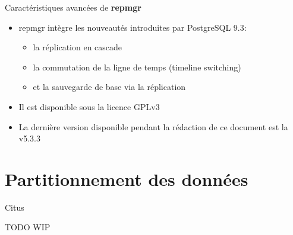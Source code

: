 
\begin{frame}[fragile]{Caractéristiques avancées de \textbf{repmgr}}

   \begin{itemize}
      \item repmgr intègre les nouveautés introduites par PostgreSQL 9.3:
         \begin{itemize}
            \item la réplication en cascade
            \item la commutation de la ligne de temps (timeline switching)
            \item et la sauvegarde de base via la réplication
         \end{itemize}
      \item Il est disponible sous la licence GPLv3
      \item La dernière version disponible pendant la rédaction de ce document est la v5.3.3
   \end{itemize}

\end{frame}


\section{Partitionnement des données}


\begin{frame}[fragile]{Citus}

   TODO
   WIP

\begin{toile}
\end{toile}

\end{frame}

